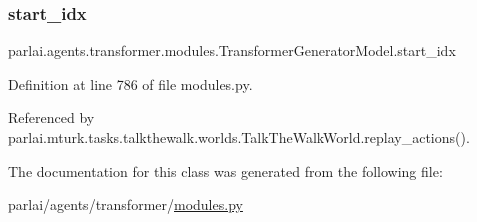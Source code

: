 \subsubsection{\texorpdfstring{start\+\_\+idx}{start\_idx}}
{\footnotesize\ttfamily parlai.\+agents.\+transformer.\+modules.\+Transformer\+Generator\+Model.\+start\+\_\+idx}



Definition at line 786 of file modules.\+py.



Referenced by parlai.\+mturk.\+tasks.\+talkthewalk.\+worlds.\+Talk\+The\+Walk\+World.\+replay\+\_\+actions().



The documentation for this class was generated from the following file\+:\begin{DoxyCompactItemize}
\item 
parlai/agents/transformer/\hyperlink{parlai_2agents_2transformer_2modules_8py}{modules.\+py}\end{DoxyCompactItemize}
